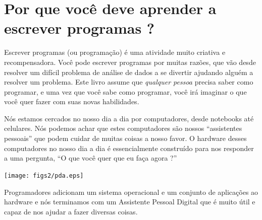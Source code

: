 
\chapter{Por que você deve aprender a escrever programas ?}

Escrever programas (ou programação) é uma atividade
muito criativa e recompensadora. Você pode escrever programas por
muitas razões, que vão desde resolver um difícil problema de 
análise de dados a se divertir ajudando alguém a resolver um
problema. Este livro assume que \emph{qualquer pessoa} precisa
saber como programar, e uma vez que você sabe como programar,
você irá imaginar o que você quer fazer com suas novas habilidades.

Nós estamos cercados no nosso dia a dia por computadores, desde
notebooks até celulares. Nós podemos achar que estes computadores
são nossos ``assistentes pessoais'' que podem cuidar de muitas coisas
a nosso favor. O hardware desses computadores no nosso dia a dia é
essencialmente construído para nos responder a uma pergunta,
``O que você quer que eu faça agora ?''

\beforefig
\centerline{\texttt{[image: figs2/pda.eps]}}
\afterfig

Programadores adicionam um sistema operacional e um conjunto de
aplicações ao hardware e nós terminamos com um Assistente 
Pessoal Digital que é muito útil e capaz de nos ajudar a fazer
diversas coisas.

